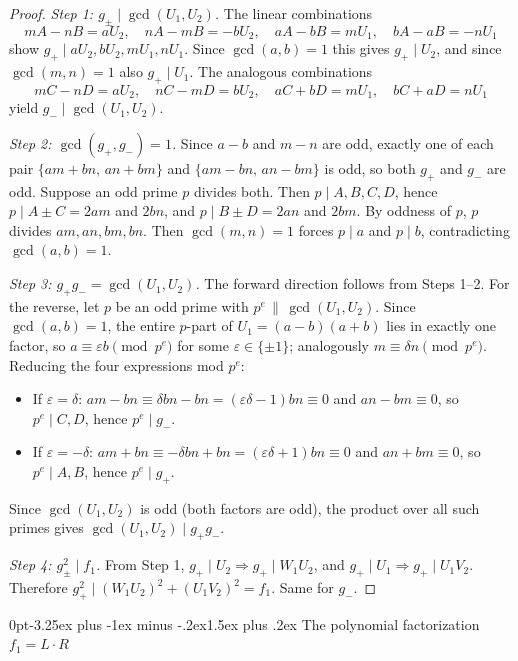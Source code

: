\documentclass[12pt,a4paper,reqno]{amsart}
\makeatletter
\renewcommand{\subsection}{\@startsection{subsection}{2}%
  {0pt}{-3.25ex plus -1ex minus -.2ex}{1.5ex plus .2ex}%
  {\normalfont\normalsize\bfseries}}
\theoremstyle{plain}
\theoremstyle{definition}
\theoremstyle{remark}
\makeatother
\begin{document}
\begin{proof}
\emph{Step 1: $g_\pm \mid \gcd(U_1, U_2)$.} The linear combinations
$$
mA - nB = aU_2,\quad nA - mB = -bU_2,\quad
aA - bB = mU_1,\quad bA - aB = -nU_1
$$
show $g_+ \mid aU_2, bU_2, mU_1, nU_1$. Since $\gcd(a, b) = 1$ this gives $g_+ \mid U_2$, and since $\gcd(m, n) = 1$ also $g_+ \mid U_1$. The analogous combinations
$$
mC - nD = aU_2,\quad nC - mD = bU_2,\quad
aC + bD = mU_1,\quad bC + aD = nU_1
$$
yield $g_- \mid \gcd(U_1, U_2)$.

\emph{Step 2: $\gcd(g_+, g_-) = 1$.} Since $a - b$ and $m - n$ are odd, exactly one of each pair $\{am + bn, \, an + bm\}$ and $\{am - bn,\, an - bm\}$ is odd, so both $g_+$ and $g_-$ are odd. Suppose an odd prime $p$ divides both. Then $p \mid A, B, C, D$, hence $p \mid A \pm C = 2am$ and $2bn$, and $p \mid B \pm D = 2an$ and $2bm$. By oddness of $p$, $p$ divides $am, an, bm, bn$. Then $\gcd(m, n) = 1$ forces $p \mid a$ and $p \mid b$, contradicting $\gcd(a, b) = 1$.

\emph{Step 3: $g_+ g_- = \gcd(U_1, U_2)$.} The forward direction follows from Steps 1--2. For the reverse, let $p$ be an odd prime with $p^e \,\|\, \gcd(U_1, U_2)$. Since $\gcd(a, b) = 1$, the entire $p$-part of $U_1 = (a-b)(a+b)$ lies in exactly one factor, so $a \equiv \varepsilon b \pmod{p^e}$ for some $\varepsilon \in \{\pm 1\}$; analogously $m \equiv \delta n \pmod{p^e}$. Reducing the four expressions mod $p^e$:
\begin{itemize}
    \item If $\varepsilon = \delta$: $am - bn \equiv \delta bn - bn = (\varepsilon\delta - 1)bn \equiv 0$ and $an - bm \equiv 0$, so $p^e \mid C, D$, hence $p^e \mid g_-$.
    \item If $\varepsilon = -\delta$: $am + bn \equiv -\delta bn + bn = (\varepsilon\delta + 1)bn \equiv 0$ and $an + bm \equiv 0$, so $p^e \mid A, B$, hence $p^e \mid g_+$.
\end{itemize}
Since $\gcd(U_1, U_2)$ is odd (both factors are odd), the product over all such primes gives $\gcd(U_1, U_2) \mid g_+ g_-$.

\emph{Step 4: $g_\pm^2 \mid f_1$.} From Step 1, $g_+ \mid U_2 \Rightarrow g_+ \mid W_1 U_2$, and $g_+ \mid U_1 \Rightarrow g_+ \mid U_1 V_2$. Therefore $g_+^2 \mid (W_1 U_2)^2 + (U_1 V_2)^2 = f_1$. Same for $g_-$.
\end{proof}

\subsection{The polynomial factorization $f_1 = L \cdot R$}
\end{document}
